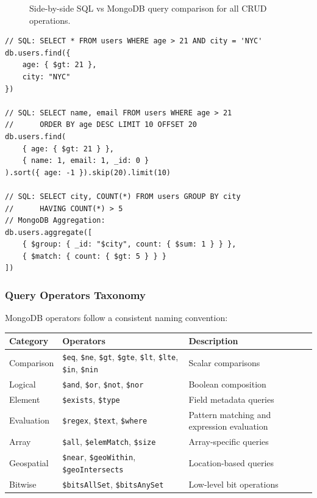\documentclass[12pt,a4paper]{article}
\begin{document}
\begin{figure}[H]
\centering
\caption{Side-by-side SQL vs MongoDB query comparison for all CRUD operations.}
\label{fig:sql-mongo}
\end{figure}

\begin{lstlisting}[language=MongoDB, caption={SQL vs MongoDB Query Comparison}]
// SQL: SELECT * FROM users WHERE age > 21 AND city = 'NYC'
db.users.find({
    age: { $gt: 21 },
    city: "NYC"
})

// SQL: SELECT name, email FROM users WHERE age > 21
//      ORDER BY age DESC LIMIT 10 OFFSET 20
db.users.find(
    { age: { $gt: 21 } },
    { name: 1, email: 1, _id: 0 }
).sort({ age: -1 }).skip(20).limit(10)

// SQL: SELECT city, COUNT(*) FROM users GROUP BY city
//      HAVING COUNT(*) > 5
// MongoDB Aggregation:
db.users.aggregate([
    { $group: { _id: "$city", count: { $sum: 1 } } },
    { $match: { count: { $gt: 5 } } }
])
\end{lstlisting}

\subsubsection{Query Operators Taxonomy}

MongoDB operators follow a consistent naming convention:

\begin{center}
\begin{tabular}{@{}llp{7cm}@{}}
\toprule
\textbf{Category} & \textbf{Operators} & \textbf{Description} \\
\midrule
Comparison & \texttt{\$eq}, \texttt{\$ne}, \texttt{\$gt}, \texttt{\$gte}, \texttt{\$lt}, \texttt{\$lte}, \texttt{\$in}, \texttt{\$nin} & Scalar comparisons \\
Logical & \texttt{\$and}, \texttt{\$or}, \texttt{\$not}, \texttt{\$nor} & Boolean composition \\
Element & \texttt{\$exists}, \texttt{\$type} & Field metadata queries \\
Evaluation & \texttt{\$regex}, \texttt{\$text}, \texttt{\$where} & Pattern matching and expression evaluation \\
Array & \texttt{\$all}, \texttt{\$elemMatch}, \texttt{\$size} & Array-specific queries \\
Geospatial & \texttt{\$near}, \texttt{\$geoWithin}, \texttt{\$geoIntersects} & Location-based queries \\
Bitwise & \texttt{\$bitsAllSet}, \texttt{\$bitsAnySet} & Low-level bit operations \\
\bottomrule
\end{tabular}
\end{center}
\end{document}
